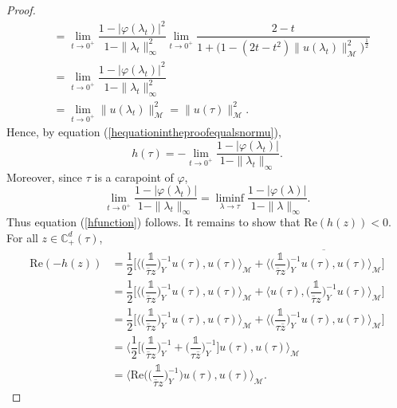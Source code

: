 \documentclass[11pt, reqno]{amsart}
\newcommand\1{\boldsymbol {1}}
\numberwithin{equation}{section}
\begin{document}
\begin{proof}
\begin{align*}
    &=\lim_{t\rightarrow 0^{+}}\dfrac{1-\lvert \varphi(\lambda_{t})\rvert^{2}}{1-\|\lambda_{t}\|^{2}_{\infty}}\lim_{t\rightarrow 0^{+}}\dfrac{2-t}{1+\big(1-(2t-t^{2})\|u(\lambda_{t})\|^{2}_{\mathcal{M}}\big)^{\frac{1}{2}}}\\
    &=\lim_{t\rightarrow 0^{+}}\dfrac{1-\lvert \varphi(\lambda_{t})\rvert^{2}}{1-\|\lambda_{t}\|^{2}_{\infty}}\\
    &= \lim_{t\rightarrow 0^{+}} \|u(\lambda_{t})\|^{2}_{\mathcal{M}}
    =\|u(\tau)\|_{\mathcal{M}}^{2}.
\end{align*}
Hence, by equation (\ref{hequationintheproofequalsnormu}), 
$$h(\tau)=-\lim_{t\rightarrow 0^{+}}\dfrac{1-\lvert \varphi(\lambda_{t}) \rvert}{1-\|\lambda_{t}\|_{\infty}}.$$
Moreover, since $\tau$ is a carapoint of $\varphi$, 
$$\lim_{t\rightarrow 0^{+}}\dfrac{1-\lvert \varphi(\lambda_{t}) \rvert}{1-\|\lambda_{t}\|_{\infty}} = \liminf_{\lambda\rightarrow \tau}\dfrac{1-\lvert \varphi(\lambda) \rvert}{1-\|\lambda\|_{\infty}}.$$
Thus equation (\ref{hfunction}) follows.
It remains to show that $\mathrm{Re}(h( z))<0$. For all $ z\in\mathbb{C}^{d}_{+}(\tau)$,
\begin{align}
    \mathrm{Re}(-h( z)) &= \dfrac{1}{2}\bigg[\bigg\langle \bigg(\dfrac{\mathds{1}}{\overline{\tau} z}\bigg)_{Y}^{-1} u(\tau),u(\tau)\bigg\rangle_{\mathcal{M}}+\overline{\bigg\langle \bigg(\dfrac{\mathds{1}}{\overline{\tau} z}\bigg)_{Y}^{-1} u(\tau),u(\tau)\bigg\rangle_{\mathcal{M}}}\bigg]\nonumber\\
    &= \dfrac{1}{2}\bigg[\bigg\langle \bigg(\dfrac{\mathds{1}}{\overline{\tau} z}\bigg)_{Y}^{-1} u(\tau),u(\tau)\bigg\rangle_{\mathcal{M}}+\bigg\langle u(\tau),\bigg(\dfrac{\mathds{1}}{\overline{\tau} z}\bigg)_{Y}^{-1} u(\tau)\bigg\rangle_{\mathcal{M}}\bigg]\nonumber\\
    &= \dfrac{1}{2}\bigg[\bigg\langle \bigg(\dfrac{\mathds{1}}{\overline{\tau} z}\bigg)_{Y}^{-1} u(\tau),u(\tau)\bigg\rangle_{\mathcal{M}}+\bigg\langle \bigg(\dfrac{\mathds{1}}{\tau \overline{z}}\bigg)_{Y}^{-1}u(\tau), u(\tau)\bigg\rangle_{\mathcal{M}}\bigg]\nonumber\\
    &= \bigg\langle \dfrac{1}{2}\bigg[\bigg(\dfrac{\mathds{1}}{\overline{\tau} z}\bigg)_{Y}^{-1}+\bigg(\dfrac{\mathds{1}}{\tau \overline{z}}\bigg)_{Y}^{-1}\bigg] u(\tau),u(\tau)\bigg\rangle_{\mathcal{M}}\nonumber\\
    &= \bigg\langle \mathrm{Re}\bigg(\bigg(\dfrac{\mathds{1}}{\overline{\tau} z}\bigg)_{Y}^{-1}\bigg) u(\tau),u(\tau)\bigg\rangle_{\mathcal{M}}.\label{realpartoftauzstar}
\end{align}

\end{proof}
\end{document}
